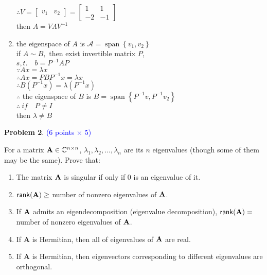 \documentclass[english,onecolumn]{IEEEtran}
\newcommand{\bA}{{\bf A}}
\def\A{\mathbf{A}}
\begin{document}
\begin{enumerate}
    $\therefore V=\left[\begin{array}{ll}v_1 & v_{2}\end{array}\right]=\left[\begin{array}{cc}1 & 1\\ -2 & -1\end{array}\right]$\\
    then $ A=V \Lambda V^{-1}$
    \item 
    the eigenspace of $A$ is $\mathcal A=\operatorname{span}\left\{v_{1}, v_{2}\right\}$\\
    if $A \sim B,$ then exist invertible matrix $P$,\\
    $s, t . \quad b=P^{-1} A P$\\
    $\because A x=\lambda x$\\
    $\therefore A x=P B P^{-1} x=\lambda x$\\
    $\therefore B\left(P^{-1} x\right)=\lambda\left(P^{-1} x\right)$\\
    $\therefore$ the eigenspace of $B$ is $B=\operatorname{span}\left\{P^{-1} v, P^{-1} v_{2}\right\}$\\
    $\therefore \  if\quad P\neq I$\\
    then $\lambda \neq B$
\end{enumerate}












\newpage
\noindent\textbf{Problem 2}. \textcolor{blue}{(6 points $\times$ 5)}

\noindent
For a matrix ${\bf A}\in \mathbb{C}^{n\times n}$, 
$\lambda_1, \lambda_2, \ldots, \lambda_n$   are its $n$ eigenvalues 
(though some of them may be the same). 
Prove that:
\begin{enumerate}
    \item The matrix ${\bf A}$ is singular if only if 0 is an eigenvalue of it.
    \item ${\sf rank}({\bf A}) \geq$ number of nonzero eigenvalues of ${\bf A}$.
    \item If ${\bf A}$ admits an  eigendecomposition (eigenvalue decomposition), ${\sf rank}({\bf A}) =$ number of nonzero eigenvalues of ${\bf A}$.
    \item If $\A$ is Hermitian, then all of eigenvalues of $\bA$ are real.
    \item If $\A$ is Hermitian, then eigenvectors corresponding to different eigenvalues are orthogonal.
\end{enumerate}
\end{document}
